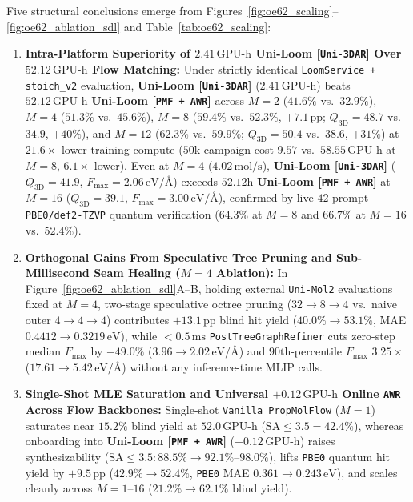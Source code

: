 \documentclass[11pt,a4paper]{article}
\begin{document}
Five structural conclusions emerge from Figures~\ref{fig:oe62_scaling}--\ref{fig:oe62_ablation_sdl} and Table~\ref{tab:oe62_scaling}:
\begin{enumerate}[leftmargin=1.5em,itemsep=2pt,topsep=2pt]
    \item \textbf{Intra-Platform Superiority of $2.41\,\text{GPU-h}$ \textbf{Uni-Loom [\texttt{Uni-3DAR}]} Over $52.12\,\text{GPU-h}$ Flow Matching:} Under strictly identical \texttt{LoomService + stoich\_v2} evaluation, \textbf{Uni-Loom [\texttt{Uni-3DAR}]} ($2.41\,\text{GPU-h}$) beats $52.12\,\text{GPU-h}$ \textbf{Uni-Loom [\texttt{PMF + AWR}]} across $M=2$ ($41.6\%$ vs.\ $32.9\%$), $M=4$ ($51.3\%$ vs.\ $45.6\%$), $M=8$ ($59.4\%$ vs.\ $52.3\%$, $+7.1\,\text{pp}$; $Q_{\text{3D}} = 48.7$ vs.\ $34.9$, $+40\%$), and $M=12$ ($62.3\%$ vs.\ $59.9\%$; $Q_{\text{3D}} = 50.4$ vs.\ $38.6$, $+31\%$) at $21.6\times$ lower training compute ($50\text{k}$-campaign cost $9.57$ vs.\ $58.55\,\text{GPU-h}$ at $M=8$, $6.1\times$ lower). Even at $M=4$ ($4.02\,\text{mol/s}$), \textbf{Uni-Loom [\texttt{Uni-3DAR}]} ($Q_{\text{3D}}=41.9$, $F_{\max}=2.06\,\text{eV/\AA}$) exceeds $52.12\text{h}$ \textbf{Uni-Loom [\texttt{PMF + AWR}]} at $M=16$ ($Q_{\text{3D}}=39.1$, $F_{\max}=3.00\,\text{eV/\AA}$), confirmed by live $42$-prompt \texttt{PBE0/def2-TZVP} quantum verification ($64.3\%$ at $M=8$ and $66.7\%$ at $M=16$ vs.\ $52.4\%$).
    \item \textbf{Orthogonal Gains From Speculative Tree Pruning and Sub-Millisecond Seam Healing ($M=4$ Ablation):} In Figure~\ref{fig:oe62_ablation_sdl}A--B, holding external \texttt{Uni-Mol2} evaluations fixed at $M=4$, two-stage speculative octree pruning ($32\to 8\to 4$ vs.\ naive outer $4\to 4\to 4$) contributes $+13.1\,\text{pp}$ blind hit yield ($40.0\% \to 53.1\%$, MAE $0.4412 \to 0.3219\,\text{eV}$), while $<0.5\,\text{ms}$ \texttt{PostTreeGraphRefiner} cuts zero-step median $F_{\max}$ by $-49.0\%$ ($3.96 \to 2.02\,\text{eV/\AA}$) and $90\text{th}$-percentile $F_{\max}$ $3.25\times$ ($17.61 \to 5.42\,\text{eV/\AA}$) without any inference-time MLIP calls.
    \item \textbf{Single-Shot MLE Saturation and Universal $+0.12\,\text{GPU-h}$ Online \texttt{AWR} Across Flow Backbones:} Single-shot \texttt{Vanilla PropMolFlow} ($M=1$) saturates near $15.2\%$ blind yield at $52.0\,\text{GPU-h}$ ($\text{SA}\le 3.5 = 42.4\%$), whereas onboarding into \textbf{Uni-Loom [\texttt{PMF + AWR}]} ($+0.12\,\text{GPU-h}$) raises synthesizability ($\text{SA}\le 3.5: 88.5\% \to 92.1\%\text{--}98.0\%$), lifts \texttt{PBE0} quantum hit yield by $+9.5\,\text{pp}$ ($42.9\% \to 52.4\%$, \texttt{PBE0} MAE $0.361 \to 0.243\,\text{eV}$), and scales cleanly across $M=1\text{--}16$ ($21.2\% \to 62.1\%$ blind yield).

\end{enumerate}
\end{document}
